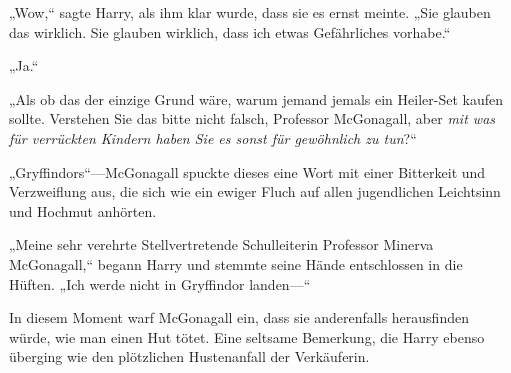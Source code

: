 „Wow,“ sagte Harry, als ihm klar wurde, dass sie es ernst meinte. „Sie glauben das wirklich. Sie glauben wirklich, dass ich etwas Gefährliches vorhabe.“

„Ja.“

„Als ob das der einzige Grund wäre, warum jemand jemals ein Heiler-Set kaufen sollte. Verstehen Sie das bitte nicht falsch, Professor McGonagall, aber \emph{mit was für verrückten Kindern haben Sie es sonst für gewöhnlich zu tun}?“

„Gryffindors“—McGonagall spuckte dieses eine Wort mit einer Bitterkeit und Verzweiflung aus, die sich wie ein ewiger Fluch auf allen jugendlichen Leichtsinn und Hochmut anhörten.

„Meine sehr verehrte Stellvertretende Schulleiterin Professor Minerva McGonagall,“ begann Harry und stemmte seine Hände entschlossen in die Hüften. „Ich werde nicht in Gryffindor landen—“

In diesem Moment warf McGonagall ein, dass sie anderenfalls herausfinden würde, wie man einen Hut tötet. Eine seltsame Bemerkung, die Harry ebenso überging wie den plötzlichen Hustenanfall der Verkäuferin.


